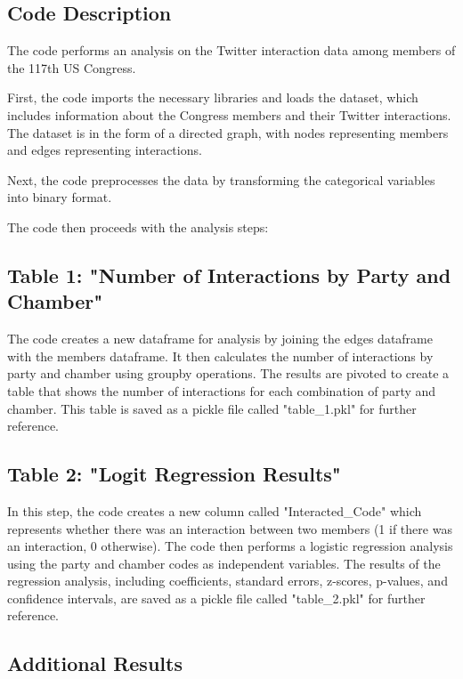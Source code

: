 \documentclass[11pt]{article}
\begin{document}
\subsection{Code Description}

The code performs an analysis on the Twitter interaction data among members of the 117th US Congress. 

First, the code imports the necessary libraries and loads the dataset, which includes information about the Congress members and their Twitter interactions. The dataset is in the form of a directed graph, with nodes representing members and edges representing interactions.

Next, the code preprocesses the data by transforming the categorical variables into binary format.

The code then proceeds with the analysis steps:

\subsection{Table 1: "Number of Interactions by Party and Chamber"}

The code creates a new dataframe for analysis by joining the edges dataframe with the members dataframe. It then calculates the number of interactions by party and chamber using groupby operations. The results are pivoted to create a table that shows the number of interactions for each combination of party and chamber. This table is saved as a pickle file called "table\_1.pkl" for further reference.

\subsection{Table 2: "Logit Regression Results"}

In this step, the code creates a new column called "Interacted\_Code" which represents whether there was an interaction between two members (1 if there was an interaction, 0 otherwise). The code then performs a logistic regression analysis using the party and chamber codes as independent variables. The results of the regression analysis, including coefficients, standard errors, z-scores, p-values, and confidence intervals, are saved as a pickle file called "table\_2.pkl" for further reference.

\subsection{Additional Results}
\end{document}
